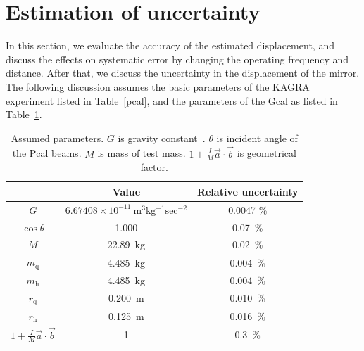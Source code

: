 \documentclass[%
 reprint,
superscriptaddress,
 amsmath,amssymb,
 aps,
]{revtex4-1}
\begin{document}
\section{Estimation of uncertainty} \label{sec:EST}
In this section, we evaluate the accuracy of the estimated displacement, and discuss the effects on systematic error by changing the operating frequency and distance. After that, we discuss the uncertainty in the displacement of the mirror. 
The following discussion assumes the basic parameters of the KAGRA experiment listed in Table~\ref{pcal}, and the parameters of the Gcal as listed in Table~\ref{sus}. 

\begin{table}
\begin{center}
\caption{\label{sus}Assumed parameters. $G$ is gravity constant~\cite{RevModPhys.88.035009}. $\theta$ is incident angle of the Pcal beams. $M$ is mass of test mass. $1+\frac{I}{M}\vec{a}\cdot \vec{b}$ is geometrical factor.}
\footnotesize
\begin{tabular}{ccc}
\hline
&Value&Relative uncertainty \\
\hline
$G$&$6.67408 \times 10^{-11}~\mathrm{m^3kg^{-1}sec^{-2}}$&0.0047 \%\\
$\cos{\theta}$ &1.000& 0.07~\%\\
$M$ &22.89~kg & 0.02~\%\\
$m_{\mathrm{q}}$&4.485~kg & 0.004~\%\\
$m_{\mathrm{h}}$& 4.485~kg &0.004~\%\\
$r_{\mathrm{q}}$&0.200~m & 0.010~\%\\
$r_{\mathrm{h}}$& 0.125~m & 0.016~\%\\
$1+\frac{I}{M}\vec{a}\cdot \vec{b}$& 1&0.3~\% \\
\hline
\end{tabular}\\
\end{center}
\end{table}
\end{document}
